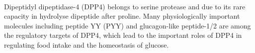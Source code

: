 \\
Dipeptidyl dipeptidase-4 (DPP4) belongs to serine protease and due to its rare capacity in hydrolyse dipeptide after proline. Many physiologically important molecules including peptide YY (PYY) and glucagon-like peptide-1/2 are among the regulatory targets of DPP4, which lead to the important roles of DPP4 in regulating food intake and the homeostasis of glucose.  